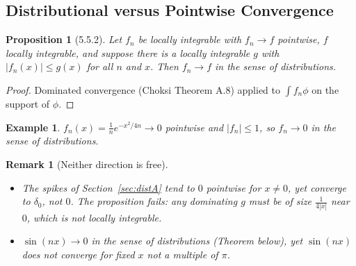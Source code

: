 \documentclass{article}
\newtheorem*{example}{Example}
\newtheorem{remark}{Remark}
\newtheorem{proposition}{Proposition}
\begin{document}
\subsection{Distributional versus Pointwise Convergence}
\begin{proposition}[5.5.2]
    Let $f_n$ be locally integrable with $f_n \to f$ pointwise, $f$ locally integrable, and suppose there is a locally integrable $g$ with $|f_n(x)| \leq g(x)$ for all $n$ and $x$. Then $f_n \to f$ in the sense of distributions.
\end{proposition}
\begin{proof}
    Dominated convergence (Choksi Theorem A.8) applied to $\int f_n\phi$ on the support of $\phi$.
\end{proof}
\begin{example}
    $f_n(x) = \frac{1}{n}e^{-x^2/4n} \to 0$ pointwise and $|f_n| \leq 1$, so $f_n \to 0$ in the sense of distributions.
\end{example}
\begin{remark}[Neither direction is free]
    \leavevmode
    \begin{itemize}
        \item The spikes of Section~\ref{sec:distA} tend to $0$ pointwise for $x \neq 0$, yet converge to $\delta_0$, not $0$. The proposition fails: any dominating $g$ must be of size $\frac{1}{4|x|}$ near $0$, which is not locally integrable.
        \item $\sin(nx) \to 0$ in the sense of distributions (Theorem below), yet $\sin(nx)$ does not converge for fixed $x$ not a multiple of $\pi$.
    \end{itemize}
\end{remark}
\end{document}
